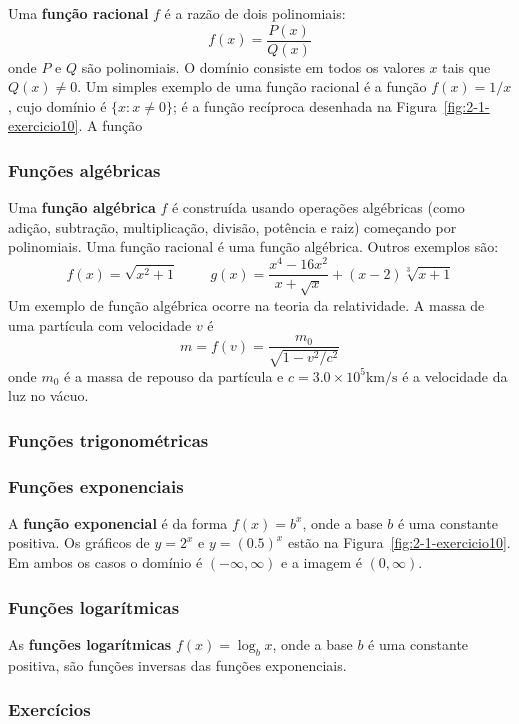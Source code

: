 Uma \textbf{função racional} $f$ é a razão de dois polinomiais:
$$f(x)=\frac{P(x)}{Q(x)}$$
onde $P$ e $Q$ são polinomiais. O domínio consiste em todos os valores $x$ tais que $Q(x)\neq 0$. Um simples exemplo de uma função racional é a função $f(x)=1/x$, cujo domínio é $\{x:x\neq 0\}$; é a função recíproca desenhada na Figura~\ref{fig:2-1-exercicio10}. A função

\subsubsection{Funções algébricas}

Uma \textbf{função algébrica} $f$ é construída usando operações algébricas (como adição, subtração, multiplicação, divisão, potência e raiz) começando por polinomiais. Uma função racional é uma função algébrica. Outros exemplos são:$$f(x)=\sqrt{x^2+1}\hspace{1cm} g(x)=\frac{x^4-16x^2}{x+\sqrt{x}}+(x-2)\sqrt[3]{x+1}$$
Um exemplo de função algébrica ocorre na teoria da relatividade. A massa de uma partícula com velocidade $v$ é $$m=f(v)=\frac{m_0}{\sqrt{1-v^2/c^2}}$$
onde $m_0$ é a massa de repouso da partícula e $c=3.0\times 10^5\si\km/\si\second$ é a velocidade da luz no vácuo.

\subsubsection{Funções trigonométricas}


\subsubsection{Funções exponenciais}

A \textbf{função exponencial} é da forma $f(x)=b^x$, onde a base $b$ é uma constante positiva. Os gráficos de $y=2^x$ e $y=(0.5)^x$ estão na Figura~\ref{fig:2-1-exercicio10}. Em ambos os casos o domínio é $(-\infty, \infty)$ e a imagem é $(0,\infty)$.

\subsubsection{Funções logarítmicas}

As \textbf{funções logarítmicas} $f(x)=\log_bx$, onde a base $b$ é uma constante positiva, são funções inversas das funções exponenciais.

\subsubsection{Exercícios}


